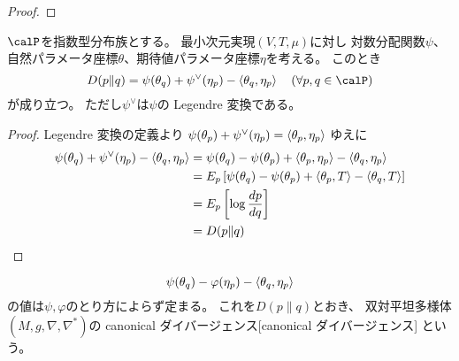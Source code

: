 \documentclass[report]{jlreq}
\begin{document}
\begin{proof}
    \TODO{}
\end{proof}

\begin{proposition}[指数型分布族とKLダイバージェンス]
    $\calP$を指数型分布族とする。
    最小次元実現$(V, T, \mu)$に対し
    対数分配関数$\psi$、自然パラメータ座標$\theta$、期待値パラメータ座標$\eta$を考える。
    このとき
    \begin{equation}
        D(p \| q)
            =
                \psi(\theta_q) + \psi^\vee(\eta_p)
                    - \myangle{\theta_q}{\eta_p}
                \quad
                (\forall p, q \in \calP)
    \end{equation}
    が成り立つ。
    ただし$\psi^\vee$は$\psi$の Legendre 変換である。
\end{proposition}

\begin{proof}
    Legendre 変換の定義より
    $\psi(\theta_p) + \psi^\vee(\eta_p)
        = \left\langle{\theta_p},{\eta_p}\right\rangle$
    ゆえに
    \begin{alignat}{1}
        \psi(\theta_q) + \psi^\vee(\eta_p)
            - \left\langle{\theta_q},{\eta_p}\right\rangle
            &=
                \psi(\theta_q) - \psi(\theta_p)
                    + \left\langle{\theta_p},{\eta_p}\right\rangle
                    - \left\langle{\theta_q},{\eta_p}\right\rangle
                \\
            &=
                E_p \left[{
                    \psi(\theta_q) - \psi(\theta_p)
                        + \left\langle{\theta_p},{T}\right\rangle
                        - \left\langle{\theta_q},{T}\right\rangle
                }\right]
                \\
            &=
                E_p \left[{
                    \log \frac{dp}{dq}
                }\right]
                \\
            &=
                D(p \| q)
    \end{alignat}
\end{proof}

\begin{propdef}
    \begin{equation}
        \psi(\theta_q) - \varphi(\eta_p)
            - \left\langle{\theta_q},{\eta_p}\right\rangle
    \end{equation}
    の値は$\psi, \varphi$のとり方によらず定まる。
    これを$D(p \| q)$とおき、
    双対平坦多様体$(M, g, \nabla, \nabla^*)$の
        {canonical ダイバージェンス}[canonical ダイバージェンス]
    という。
\end{propdef}
\end{document}
